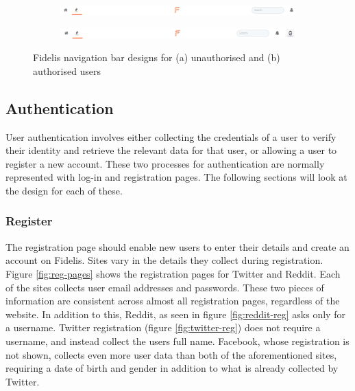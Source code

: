 \begin{figure}[H]
\centering
\begin{subfigure}{1\linewidth}
	\includegraphics[width=1\linewidth]{Images/Design/nav-unauthorised}
	\caption{}
	\label{fig:nav-unauth}
\end{subfigure}
\begin{subfigure}{1\linewidth}
	\includegraphics[width=1\linewidth]{Images/Design/nav-authorised}
	\caption{}
	\label{fig:nav-auth}
\end{subfigure}
\caption{Fidelis navigation bar designs for (a) unauthorised and (b) authorised users}
\label{fig:fidelis-navs}
\end{figure}

\subsection{Authentication}
User authentication involves either collecting the credentials of a user to verify their identity and retrieve the relevant data for that user, or allowing a user to register a new account. These two processes for authentication are normally represented with log-in and registration pages. The following sections will look at the design for each of these.

\subsubsection{Register}
The registration page should enable new users to enter their details and create an account on Fidelis. Sites vary in the details they collect during registration. Figure \ref{fig:reg-pages} shows the registration pages for Twitter and Reddit. Each of the sites collects user email addresses and passwords. These two pieces of information are consistent across almost all registration pages, regardless of the website. In addition to this, Reddit, as seen in figure \ref{fig:reddit-reg} asks only for a username. Twitter registration (figure \ref{fig:twitter-reg}) does not require a username, and instead collect the users full name. Facebook, whose registration is not shown, collects even more user data than both of the aforementioned sites, requiring a date of birth and gender in addition to what is already collected by Twitter. 

